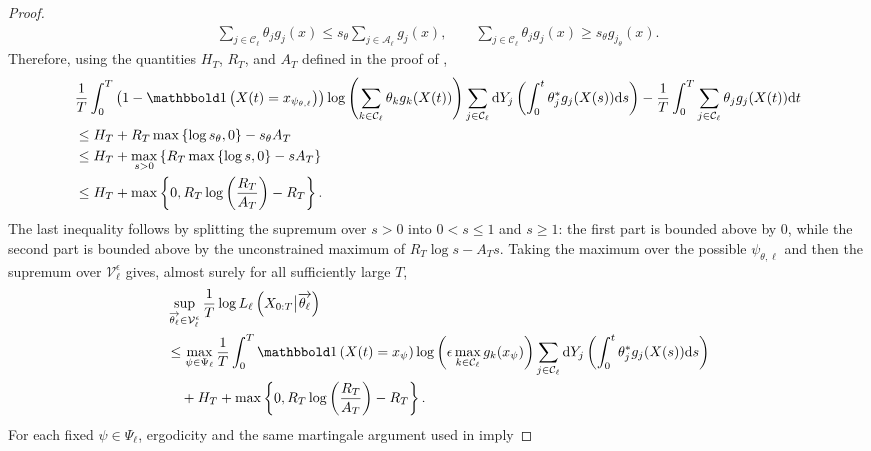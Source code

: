 \documentclass[pdflatex,sn-mathphys-num]{sn-jnl}%
\def\dd{\text{d}}
\theoremstyle{thmstyleone}%
\theoremstyle{thmstyletwo}%
\theoremstyle{thmstylethree}%
\begin{document}
\begin{appendices}
\begin{proof}
\begin{align*}
        \sum_{j\in\mathcal C_\ell}\theta_jg_j(x)
        \leq s_\theta\sum_{j\in\mathcal A_\ell}g_j(x),
        \qquad
        \sum_{j\in\mathcal C_\ell}\theta_jg_j(x)
        \geq s_\theta g_{j_\theta}(x).
    \end{align*}
    Therefore, using the quantities $H_T$, $R_T$, and $A_T$ defined in the proof of ,
    \begin{align*}
        &\frac{1}{T}\int_0^T
        \left(1-\mathbbold 1\left(X(t)=x_{\psi_{\theta,\ell}}\right)\right)
        \log\left(\sum_{k\in\mathcal C_\ell}\theta_k g_k(X(t))\right)
        \sum_{j\in\mathcal C_\ell}
        \dd Y_j\left(\int_0^t\theta_j^*g_j(X(s))\dd s\right)
        -\frac{1}{T}\int_0^T\sum_{j\in\mathcal C_\ell}\theta_jg_j(X(t))\dd t\\
        &\leq H_T+R_T\max\left\{\log s_\theta,0\right\}-s_\theta A_T\\
        &\leq H_T+\max_{s>0} \left\{R_T\max\left\{\log s, 0\right\}-s A_T\right\}\\
        &\leq H_T+\max\left\{0,
        R_T\log\left(\frac{R_T}{A_T}\right)-R_T
        \right\}.
    \end{align*}
    The last inequality follows by splitting the supremum over $s>0$ into $0<s\leq1$ and $s\geq1$: the first part is bounded above by $0$, while the second part is bounded above by the unconstrained maximum of $R_T\log s-A_Ts$.
    Taking the maximum over the possible $\psi_{\theta,\ell}$ and then the supremum over $\mathcal V_\ell^\epsilon$ gives, almost surely for all sufficiently large $T$,
    \begin{align}\label{eq. upper bound in the finit time interval}
        &\sup_{\overrightarrow{\theta_\ell}\in\mathcal V_\ell^\epsilon}
        \frac{1}{T}\log L_\ell\left(X_{0:T}\big|\overrightarrow{\theta_\ell}\right)\\
        &\leq
        \max_{\psi\in\Psi_\ell}
        \frac{1}{T}\int_0^T
        \mathbbold 1\left(X(t)=x_\psi\right)
        \log\left(\epsilon\max_{k\in\mathcal C_\ell}g_k(x_\psi)\right)
        \sum_{j\in\mathcal C_\ell}
        \dd Y_j\left(\int_0^t\theta_j^*g_j(X(s))\dd s\right) \notag\\
        &\quad+H_T+\max\left\{0,
        R_T\log\left(\frac{R_T}{A_T}\right)-R_T
        \right\}. \notag
    \end{align}
    For each fixed $\psi\in\Psi_\ell$, ergodicity and the same martingale argument used in  imply

\end{proof}
\end{appendices}
\end{document}
